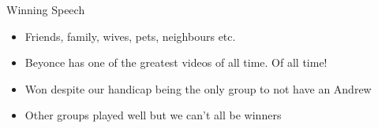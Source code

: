 \documentclass{beamer}
\begin{document}
\begin{frame}{Winning Speech}
    \begin{itemize}
  \item
    Friends, family, wives, pets, neighbours etc.
  \item
   Beyonce has one of the greatest videos of all time. Of all time!
  \item
   Won despite our handicap being the only group to not have an Andrew
  \item
   Other groups played well but we can't all be winners
  \end{itemize}
\end{frame}
\end{document}
